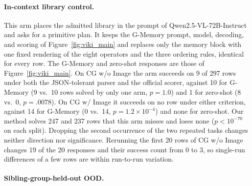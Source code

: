 \paragraph{In-context library control.}
This arm places the admitted library in the prompt of Qwen2.5-VL-72B-Instruct and asks for a primitive plan. It keeps the G-Memory prompt, model, decoding, and scoring of Figure~\ref{fig:viki_main} and replaces only the memory block with one fixed rendering of the eight operators and the three ordering rules, identical for every row. The G-Memory and zero-shot responses are those of Figure~\ref{fig:viki_main}. On CG w/o Image the arm succeeds on 9 of 297 rows under both the JSON-tolerant parser and the official scorer, against 10 for G-Memory (9 vs.\ 10 rows solved by only one arm, $p=1.0$) and 1 for zero-shot (8 vs.\ 0, $p=.0078$). On CG w/ Image it succeeds on no row under either criterion, against 14 for G-Memory (0 vs.\ 14, $p=1.2\times10^{-4}$) and none for zero-shot. Our method solves 247 and 237 rows that this arm misses and loses none ($p<10^{-70}$ on each split). Dropping the second occurrence of the two repeated tasks changes neither direction nor significance. Rerunning the first 20 rows of CG w/o Image changes 19 of the 20 responses and their success count from 0 to 3, so single-run differences of a few rows are within run-to-run variation.

\paragraph{Sibling-group-held-out OOD.}
